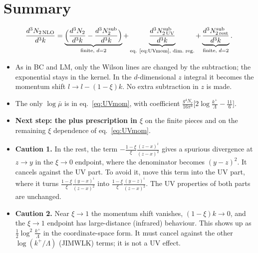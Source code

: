 \documentclass[10pt]{article}
\numberwithin{equation}{section}
\begin{document}
\section{Summary}
\begin{equation}
\frac{d^{3}N_{2\,\rm NLO}}{d^{3}k}=\underbrace{\Big(\frac{d^{3}N_{2}}{d^{3}k}-\frac{d^{3}N^{\rm sub}_{2}}{d^{3}k}\Big)}_{\text{finite, }d=2}+\underbrace{\frac{d^{3}N^{\rm sub}_{2\,\rm UV}}{d^{3}k}}_{\text{eq. \eqref{eq:UVmom}, dim.\ reg.}}+\underbrace{\frac{d^{3}N^{\rm sub}_{2\,\rm rest}}{d^{3}k}}_{\text{finite, }d=2}.
\end{equation}
\begin{itemize}
\item As in BC and LM, only the Wilson lines are changed by the subtraction; the exponential stays in the kernel. In the $d$-dimensional $z$ integral it becomes the momentum shift $l\to l-(1-\xi)k$. No extra subtraction in $z$ is made.
\item The only $\log\bar\mu$ is in eq.~\eqref{eq:UVmom}, with coefficient $\frac{g^{4}N_{c}}{16\pi^{4}}\big[2\log\frac{k^{+}}{\Lambda}-\frac{11}{6}\big]$.
\item \textbf{Next step: the plus prescription in $\xi$} on the finite pieces and on the remaining $\xi$ dependence of eq.~\eqref{eq:UVmom}.
\item \textbf{Caution 1.} In the rest, the term $-\frac{1-\xi}{\xi}\frac{(z-x)^{i}}{(z-x)^{2}}$ gives a spurious divergence at $z\to y$ in the $\xi\to0$ endpoint, where the denominator becomes $(y-z)^{2}$. It cancels against the UV part. To avoid it, move this term into the UV part, where it turns $\frac{1-\xi}{\xi}\frac{(y-x)^{i}}{(z-x)^{2}}$ into $\frac{1-\xi}{\xi}\frac{(y-z)^{i}}{(z-x)^{2}}$. The UV properties of both parts are unchanged.
\item \textbf{Caution 2.} Near $\xi\to1$ the momentum shift vanishes, $(1-\xi)k\to0$, and the $\xi\to1$ endpoint has large-distance (infrared) behaviour. This shows up as $\frac12\log^{2}\frac{k^{+}}{\Lambda}$ in the coordinate-space form. It must cancel against the other $\log(k^{+}/\Lambda)$ (JIMWLK) terms; it is not a UV effect.
\end{itemize}
\end{document}

